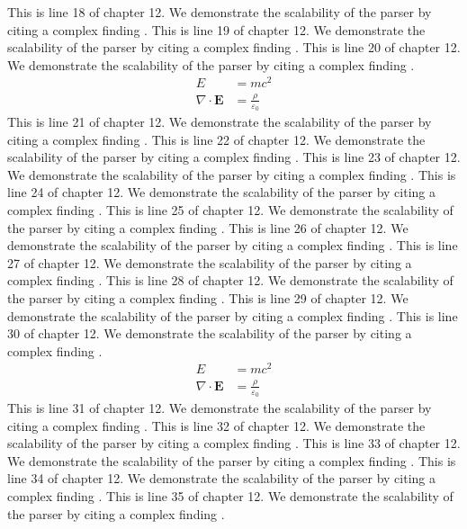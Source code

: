 This is line 18 of chapter 12. We demonstrate the scalability of the parser by citing a complex finding \cite{ref12_18}.
This is line 19 of chapter 12. We demonstrate the scalability of the parser by citing a complex finding \cite{ref12_19}.
This is line 20 of chapter 12. We demonstrate the scalability of the parser by citing a complex finding \cite{ref12_20}.
\begin{align*}
  E &= mc^2 \\
  \nabla \cdot \mathbf{E} &= \frac{\rho}{\varepsilon_0}
\end{align*}
This is line 21 of chapter 12. We demonstrate the scalability of the parser by citing a complex finding \cite{ref12_21}.
This is line 22 of chapter 12. We demonstrate the scalability of the parser by citing a complex finding \cite{ref12_22}.
This is line 23 of chapter 12. We demonstrate the scalability of the parser by citing a complex finding \cite{ref12_23}.
This is line 24 of chapter 12. We demonstrate the scalability of the parser by citing a complex finding \cite{ref12_24}.
This is line 25 of chapter 12. We demonstrate the scalability of the parser by citing a complex finding \cite{ref12_25}.
This is line 26 of chapter 12. We demonstrate the scalability of the parser by citing a complex finding \cite{ref12_26}.
This is line 27 of chapter 12. We demonstrate the scalability of the parser by citing a complex finding \cite{ref12_27}.
This is line 28 of chapter 12. We demonstrate the scalability of the parser by citing a complex finding \cite{ref12_28}.
This is line 29 of chapter 12. We demonstrate the scalability of the parser by citing a complex finding \cite{ref12_29}.
This is line 30 of chapter 12. We demonstrate the scalability of the parser by citing a complex finding \cite{ref12_30}.
\begin{align*}
  E &= mc^2 \\
  \nabla \cdot \mathbf{E} &= \frac{\rho}{\varepsilon_0}
\end{align*}
This is line 31 of chapter 12. We demonstrate the scalability of the parser by citing a complex finding \cite{ref12_31}.
This is line 32 of chapter 12. We demonstrate the scalability of the parser by citing a complex finding \cite{ref12_32}.
This is line 33 of chapter 12. We demonstrate the scalability of the parser by citing a complex finding \cite{ref12_33}.
This is line 34 of chapter 12. We demonstrate the scalability of the parser by citing a complex finding \cite{ref12_34}.
This is line 35 of chapter 12. We demonstrate the scalability of the parser by citing a complex finding \cite{ref12_35}.
